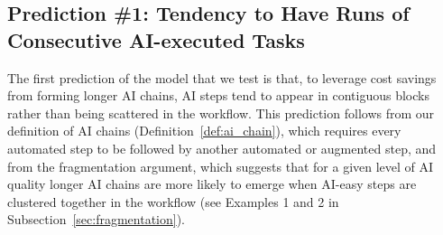 \subsection{Prediction \#1: Tendency to Have Runs of Consecutive AI-executed Tasks}
\label{sec:chainLength_prediction}

The first prediction of the model that we test is that, to leverage cost savings from forming longer AI chains, AI steps tend to appear in contiguous blocks rather than being scattered in the workflow.
This prediction follows from our definition of AI chains (Definition~\ref{def:ai_chain}), which requires every automated step to be followed by another automated or augmented step, and from the fragmentation argument, which suggests that for a given level of AI quality longer AI chains are more likely to emerge when AI-easy steps are clustered together in the workflow (see Examples 1 and 2 in Subsection~\ref{sec:fragmentation}).


